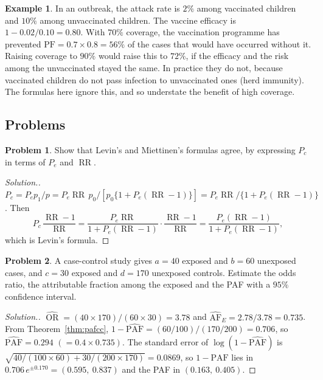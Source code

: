 \documentclass[11pt,a4paper]{article}
\numberwithin{equation}{section}
\DeclareMathOperator{\OR}{OR}
\DeclareMathOperator{\RR}{RR}
\theoremstyle{definition}
\newtheorem{exa}[thm]{Example}
\newtheorem{problemx}{Problem}[subsection]
\newenvironment{problem}{\begin{problemx}}{\end{problemx}}
\newenvironment{solution}
  {\renewcommand{\qedsymbol}{}\begin{proof}[\textit{Solution}.]}
  {\end{proof}}
\begin{document}
\begin{exa}
In an outbreak, the attack rate is $2\%$ among vaccinated children and $10\%$ among unvaccinated children. The vaccine efficacy is
$1 - 0.02/0.10 = 0.80$. With $70\%$ coverage, the vaccination programme has prevented $\text{PF} = 0.7 \times 0.8 = 56\%$ of the cases that would have
occurred without it. Raising coverage to $90\%$ would raise this to $72\%$, if the efficacy and the risk among the unvaccinated stayed the
same. In practice they do not, because vaccinated children do not pass infection to unvaccinated ones (herd immunity). The formulas
here ignore this, and so understate the benefit of high coverage.
\end{exa}

\subsection{Problems}

\begin{problem}
Show that Levin's and Miettinen's formulas agree, by expressing $P_c$ in terms of $P_e$ and $\RR$.
\end{problem}

\begin{solution}
$P_c = P_e p_1/p = P_e\RR\,p_0/[p_0\{1 + P_e(\RR - 1)\}] = P_e\RR/\{1 + P_e(\RR - 1)\}$. Then
\[
P_c\,\frac{\RR - 1}{\RR} = \frac{P_e\RR}{1 + P_e(\RR - 1)} \cdot \frac{\RR - 1}{\RR} = \frac{P_e(\RR - 1)}{1 + P_e(\RR - 1)} ,
\]
which is Levin's formula.
\end{solution}

\begin{problem}
A case-control study gives $a = 40$ exposed and $b = 60$ unexposed cases, and $c = 30$ exposed and $d = 170$ unexposed controls. Estimate the
odds ratio, the attributable fraction among the exposed and the PAF with a $95\%$ confidence interval.
\end{problem}

\begin{solution}
$\widehat{\OR} = (40 \times 170)/(60 \times 30) = 3.78$ and $\widehat{\text{AF}}_E = 2.78/3.78 = 0.735$. From Theorem~\ref{thm:pafcc},
$1 - \widehat{\text{PAF}} = (60/100)/(170/200) = 0.706$, so $\widehat{\text{PAF}} = 0.294$ $(= 0.4 \times 0.735)$. The standard error of $\log(1 - \widehat{\text{PAF}})$ is
$\sqrt{40/(100 \times 60) + 30/(200 \times 170)} = 0.0869$, so $1 - \text{PAF}$ lies in $0.706\,e^{\pm 0.170} = (0.595,\ 0.837)$ and the PAF in $(0.163,\ 0.405)$.
\end{solution}
\end{document}
